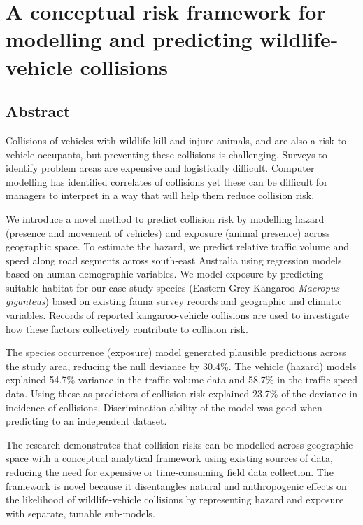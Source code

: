 \chapter{A conceptual risk framework for modelling and predicting wildlife-vehicle collisions}\label{sec:egk}
\newpage

\begin{localsize}{11}
\section*{\centering Abstract}

Collisions of vehicles with wildlife kill and injure animals, and are also a risk to vehicle occupants, but preventing these collisions is challenging. Surveys to identify problem areas are expensive and logistically difficult. Computer modelling has identified correlates of collisions yet these can be difficult for managers to interpret in a way that will help them reduce collision risk.

We introduce a novel method to predict collision risk by modelling hazard (presence and movement of vehicles) and exposure (animal presence) across geographic space. To estimate the hazard, we predict relative traffic volume and speed along road segments across south-east Australia using regression models based on human demographic variables. We model exposure by predicting suitable habitat for our case study species (Eastern Grey Kangaroo \textit{Macropus giganteus}) based on existing fauna survey records and geographic and climatic variables. Records of reported kangaroo-vehicle collisions are used to investigate how these factors collectively contribute to collision risk.

The species occurrence (exposure) model generated plausible predictions across the study area, reducing the null deviance by 30.4\%. The vehicle (hazard) models explained 54.7\% variance in the traffic volume data and 58.7\% in the traffic speed data. Using these as predictors of collision risk explained 23.7\% of the deviance in incidence of collisions. Discrimination ability of the model was good when predicting to an independent dataset.

The research demonstrates that collision risks can be modelled across geographic space with a conceptual analytical framework using existing sources of data, reducing the need for expensive or time-consuming field data collection. The framework is novel because it disentangles natural and anthropogenic effects on the likelihood of wildlife-vehicle collisions by representing hazard and exposure with separate, tunable sub-models.

\end{localsize}

